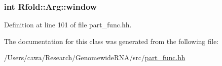 \hypertarget{class_rfold_1_1_arg_abf6954c2deff613f191b1fae248389f3}{
\subsubsection[{window}]{\setlength{\rightskip}{0pt plus 5cm}int Rfold\+::\+Arg\+::window}}\label{class_rfold_1_1_arg_abf6954c2deff613f191b1fae248389f3}


Definition at line 101 of file part\+\_\+func.\+hh.



The documentation for this class was generated from the following file\+:\begin{DoxyCompactItemize}
\item 
/\+Users/cawa/\+Research/\+Genomewide\+R\+N\+A/src/\hyperlink{part__func_8hh}{part\+\_\+func.\+hh}\end{DoxyCompactItemize}
